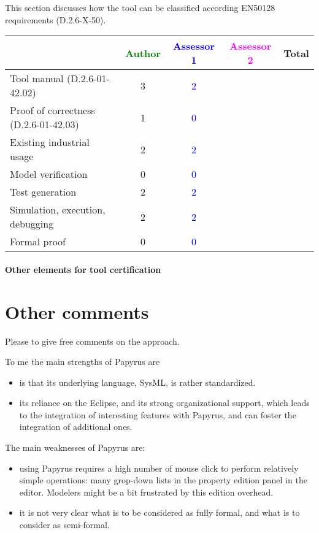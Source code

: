 This section discusses how the tool can be classified according EN50128 requirements (D.2.6-X-50).


\begin{tabular}{|l | c | c | c | c|}
\hline
& \textcolor{green}{Author} & \textcolor{blue}{Assessor 1} & \textcolor{magenta}{Assessor 2} & Total \\
\hline
Tool manual (D.2.6-01-42.02) & 3 & \textcolor{blue}{2} & & \\
\hline
Proof of correctness (D.2.6-01-42.03) & 1 & \textcolor{blue}{0} & & \\
\hline
Existing industrial usage & 2 & \textcolor{blue}{2} & & \\
\hline
Model verification & 0 & \textcolor{blue}{0} & & \\
\hline
Test generation & 2 & \textcolor{blue}{2} & & \\
\hline
Simulation, execution, debugging & 2 & \textcolor{blue}{2} & & \\
\hline
Formal proof & 0 & \textcolor{blue}{0} & & \\
\hline
\end{tabular}

\paragraph{Other elements for tool certification}

\section{Other comments}
Please to give free comments on the approach.

\begin{assessor1}
To me the main strengths of Papyrus are
\begin{itemize}
\item is that its underlying language, SysML, is rather standardized. 
\item its reliance on the Eclipse, and its strong organizational support, which leads to the integration of interesting features with Papyrus, and can foster the integration of additional ones. 
\end{itemize}

The main weaknesses of Papyrus are: 
\begin{itemize}
\item using Papyrus requires a high number of mouse click to perform relatively simple operations: many grop-down lists in the property edition panel in the editor. Modelers might be a bit frustrated by this edition overhead. 
\item it is not very clear what is to be considered as fully formal, and what is to consider as semi-formal.  
\end{itemize}
\end{assessor1}

